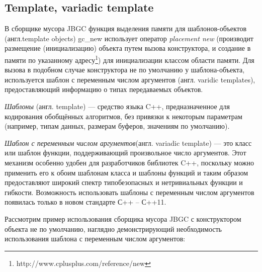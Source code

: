 \subsection{Template, variadic template} 

В сборщике мусора JBGC функция выделения памяти для шаблонов-объектов (англ.template objects) gc\_new  использует оператор \textit{placement new} (производит размещение (инициализацию) объекта путем вызова конструктора, и создание в памяти по указанному адресу\footnote{http://www.cplusplus.com/reference/new}) для инициализации классом области памяти. Для вызова в подобном случае конструктора не по умолчанию у шаблона-объекта,  используется шаблон с переменным числом аргументов (англ. varidic templates), предоставляющий информацию о типах передаваемых объектов.

\textit{Шаблоны} (англ. template) — средство языка C++, предназначенное для кодирования обобщённых алгоритмов, без привязки к некоторым параметрам (например, типам данных, размерам буферов, значениям по умолчанию). 

\textit{Шаблон с переменным числом аргументов}(англ. variadic template) — это класс или шаблон функции, поддерживающий произвольное число аргументов. Этот механизм особенно удобен для разработчиков библиотек C++, поскольку можно применить его к обоим шаблонам класса и шаблоны функций и таким образом предоставляют широкий спектр типобезопасных и нетривиальных функции и гибкости. Возможность использовать шаблоны с переменным числом аргументов появилась только в новом стандарте С++ -- С++11. 

Рассмотрим пример использования сборщика мусора JBGC  с конструктором объекта не по умолчанию,  наглядно демонстрирующий необходимость использования шаблона с переменным числом аргументов:

